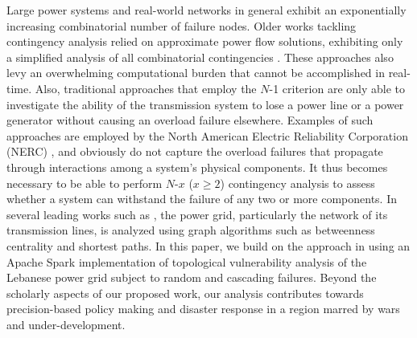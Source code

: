 Large power systems and real-world networks in general exhibit an exponentially increasing combinatorial number of failure nodes. Older works tackling contingency analysis relied on approximate power flow solutions, exhibiting only a simplified analysis of all combinatorial contingencies \cite{EjebeAl79,Ekwue91}. These approaches also levy an overwhelming computational burden that cannot be accomplished in real-time. Also, traditional approaches that employ the $N$-1 criterion are only able to investigate the ability of the transmission system to lose a power line or a power generator without causing an overload failure elsewhere. Examples of such approaches are employed by the North American Electric Reliability Corporation (NERC) \cite{JinAl10}, and obviously do not capture the overload failures that propagate through interactions among a system's physical components. It thus becomes necessary to be able to perform $N$-$x$ ($x \geq2$) contingency analysis to assess whether a system can withstand the failure of any two or more components. In several leading works such as \cite{2000Natur.406..378A,JinAl10, DaqingAl14}, the power grid, particularly the network of its transmission lines, is analyzed using graph algorithms such as betweenness centrality and shortest paths. In this paper, we build on the approach in  \cite{2000Natur.406..378A} using an Apache Spark implementation of topological vulnerability analysis of the Lebanese power grid subject to random  and cascading failures. Beyond the scholarly aspects of our proposed work, our analysis contributes towards precision-based policy making and disaster response in a region marred by wars and under-development. 
 

